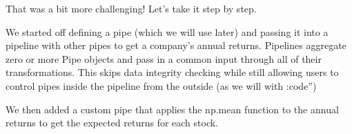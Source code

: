 \documentclass[letterpaper,10pt,english]{sphinxmanual}
\begin{document}
\begin{sphinxVerbatim}[commandchars=\\\{\}]
  

  

    \PYGZbs{}
       \PYG{p}{[}\PYG{p}{]}  \PYGZbs{}

     \PYGZbs{}

    
\end{sphinxVerbatim}

That was a bit more challenging! Let’s take it step by step.

We started off defining a  pipe (which we will use later) and passing it into a pipeline with other pipes to get a company’s annual returns. Pipelines aggregate zero or more Pipe objects and pass in a common input through all of their transformations. This skips data integrity checking while still allowing users to control pipes inside the pipeline from the outside (as we will with :code”)

We then added a custom pipe that applies the np.mean function to the annual returns to get the expected returns for each stock.
\end{document}
